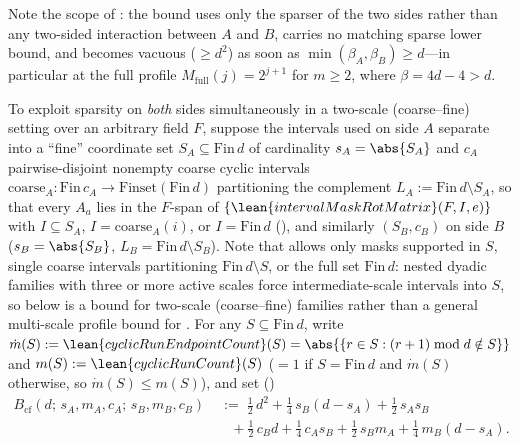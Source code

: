 Note the scope of : the bound uses only the sparser of the two sides
rather than any two-sided interaction between $A$ and $B$, carries no matching sparse lower bound,
and becomes vacuous ($\ge d^2$) as soon as $\min(\beta_A, \beta_B) \ge d$---in particular at the full
profile $M_{\mathrm{full}}(j) = 2^{j+1}$ for $m \ge 2$, where $\beta = 4d - 4 > d$.

To exploit sparsity on \emph{both} sides simultaneously in a two-scale (coarse--fine) setting over an
arbitrary field $F$, suppose the intervals used on side $A$ separate into a ``fine'' coordinate set
$S_A \subseteq \mathrm{Fin}\,d$ of cardinality $s_A = \abs{S_A}$ and $c_A$ pairwise-disjoint nonempty
coarse cyclic intervals $\mathrm{coarse}_A : \mathrm{Fin}\,c_A \to \mathrm{Finset}(\mathrm{Fin}\,d)$
partitioning the complement $L_A := \mathrm{Fin}\,d \setminus S_A$, so that every $A_a$ lies in the
$F$-span of $\{\lean{intervalMaskRotMatrix}(F, I, e)\}$ with $I \subseteq S_A$,
$I = \mathrm{coarse}_A(i)$, or $I = \mathrm{Fin}\,d$ (), and
similarly $(S_B, c_B)$ on side $B$ ($s_B = \abs{S_B}$, $L_B = \mathrm{Fin}\,d \setminus S_B$). Note
that  allows only masks supported in $S$, single coarse
intervals partitioning $\mathrm{Fin}\,d \setminus S$, or the full set $\mathrm{Fin}\,d$: nested
dyadic families with three or more active scales force intermediate-scale intervals into $S$, so
 below is a bound for two-scale (coarse--fine) families rather than a
general multi-scale profile bound for \cite[Problem~9.3]{SeventeenthPaper2026}. For any
$S \subseteq \mathrm{Fin}\,d$, write
$\dot{m}(S) := \lean{cyclicRunEndpointCount}(S) = \abs{\{r \in S : (r + 1) \bmod d \notin S\}}$
and $m(S) := \lean{cyclicRunCount}(S)$ ($= 1$ if $S = \mathrm{Fin}\,d$ and $\dot{m}(S)$ otherwise, so
$\dot{m}(S) \le m(S)$), and set ()
\begin{align*}
  B_{\mathrm{cf}}(d;\, s_A, m_A, c_A;\, s_B, m_B, c_B)
  &\;:=\;
  \frac{1}{2}\,d^2
  + \frac{1}{4}\,s_B(d - s_A)
  + \frac{1}{2}\,s_A s_B \\
  &\quad + \frac{1}{2}\,c_B d
  + \frac{1}{4}\,c_A s_B
  + \frac{1}{2}\,s_B m_A
  + \frac{1}{4}\,m_B(d - s_A).
\end{align*}

